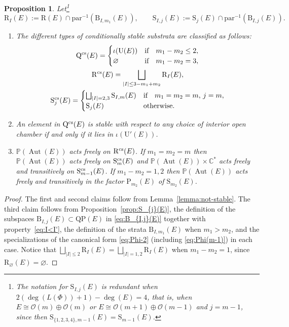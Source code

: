 \documentclass[10pt,a4paper]{amsart}
\newcommand{\field}[1]{\ensuremath{\mathbb{#1}}}
\newcommand{\CC}{\field{C}}
\newcommand{\PP}{\field{P}}
\newcommand{\calO}{\mathcal{O}}
\DeclareMathOperator{\Aut}{Aut}
\numberwithin{equation}{section}
\newtheorem{Proposition}[Theorem]{Proposition}
 { \theoremstyle{definition}
\newtheorem{Definition}[Theorem]{Definition}
\newtheorem{Note}[Theorem]{Note}
\newtheorem{Example}[Theorem]{Example}
\newtheorem{Remark}[Theorem]{Remark} }
\begin{document}
\begin{Proposition}\label{prop:CS}
Let\footnote{The notation for $\mathrm{S}_{I,j}(E)$ is redundant when $2(\deg(L(\Phi)) +1) - \deg(E) = 4$, that is, when $E\cong\calO(m)\oplus\calO(m)$ or $E\cong\calO(m+1)\oplus\calO(m-1)$ and $j=m-1$, since then $\mathrm{S}_{\{1,2,3,4\},m-1}(E) = \mathrm{S}_{m-1}(E)$.}
\[
\mathrm{R}_{I}(E):=\mathrm{R}(E)\cap \mathrm{par}^{-1}(\mathrm{B}_{I,m_{1}}(E)),\qquad
\mathrm{S}_{I,j}(E):=\mathrm{S}_{j}(E)\cap\mathrm{par}^{-1}(\mathrm{B}_{I,j}(E)).
\]
\begin{enumerate}\itemsep=0pt
\item[$(i)$] The different types of conditionally stable substrata are classified as follows:
\begin{gather*}
\mathrm{Q}^{\rm cs}(E)=
\begin{cases}
\iota(\mathrm{U}(E)) & \text{if} \quad m_{1} - m_{2} \leq 2,
\\
\varnothing & \text{if} \quad m_{1} -m_{2} = 3,
\end{cases}
\\
\mathrm{R}^{\rm cs}(E)=
\bigsqcup_{\vert I\vert \leq 3-m_{1}+m_{2}}\mathrm{R}_{I}(E),
\\
\mathrm{S}^{\rm cs}_{j}(E)=
\begin{cases}
\bigsqcup_{\vert I\vert = 2,3}\mathrm{S}_{I,m}(E) & \text{if} \quad m_{1} = m_{2}=m,\, j=m,
\\
\mathrm{S}_{j}(E) & \text{otherwise.}
\end{cases}
\end{gather*}
\item[$(ii)$] An element in $\mathrm{Q}^{\rm cs}(E)$ is stable with respect to any choice of interior open chamber if and only if it lies in $\iota(\mathrm{U}'(E))$.
\item[$(iii)$] $\PP(\Aut(E))$ acts freely on $\mathrm{R}^{\rm cs}(E)$. If $m_{1}=m_{2}=m$ then $\PP(\Aut(E))$ acts freely on $\mathrm{S}^{\rm cs}_{m}(E)$ and $\PP(\Aut(E))\times \CC^{*}$ acts freely and transitively on $\mathrm{S}^{\rm cs}_{m-1}(E)$. If $m_{1}-m_{2}=1,2$ then $\PP(\Aut(E))$ acts freely and transitively in the factor $\mathrm{P}_{m_{2}}(E)$ of $\mathrm{S}_{m_{2}}(E)$.
 \end{enumerate}
\end{Proposition}

\begin{proof}
The first and second claims follow from Lemma~\ref{lemma:not-stable}. The third claim follows from Proposition~\ref{prop:S_{j}(E)}, the definition of the subspaces $\mathrm{B}_{I,j}(E)\subset \mathrm{QP}(E)$ in \eqref{eq:B_{I,j}(E)} together with property~\eqref{eq:I<I'}, the definition of the strata $\mathrm{B}_{I,m_{1}}(E)$ when $m_{1}>m_{2}$, and the specializations of the canonical form \eqref{eq:Phi-2} (including \eqref{eq:Phi(m-1)}) in each case. Notice that $\bigsqcup_{\vert I\vert \leq 2}\mathrm{R}_{I}(E) = \bigsqcup_{\vert I\vert =1,2}\mathrm{R}_{I}(E)$ when $m_{1}-m_{2} =1$, since $\mathrm{R}_{\varnothing }(E) = \varnothing $.
\end{proof}
\end{document}
